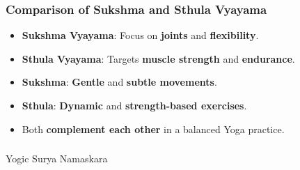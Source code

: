 \begin{frame}[fragile]\frametitle{Comparison of Sukshma and Sthula Vyayama}

      \begin{itemize}
        \item \textbf{Sukshma Vyayama}: Focus on \textbf{joints} and \textbf{flexibility}.
        \item \textbf{Sthula Vyayama}: Targets \textbf{muscle strength} and \textbf{endurance}.
        \item \textbf{Sukshma}: \textbf{Gentle} and \textbf{subtle movements}.
        \item \textbf{Sthula}: \textbf{Dynamic} and \textbf{strength-based exercises}.
        \item Both \textbf{complement each other} in a balanced Yoga practice.
      \end{itemize}

\end{frame}


\begin{frame}[fragile]\frametitle{}
\begin{center}
{\Large Yogic Surya Namaskara}
\end{center}
\end{frame}

